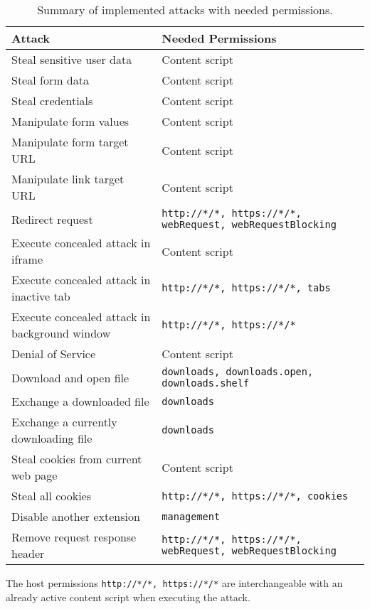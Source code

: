 	
	\begin{table}
		\begin{tabular}{|l|l|} \hline 
			\textbf{Attack} & \textbf{Needed Permissions} \\ \hline
			Steal sensitive user data & Content script \\
			Steal form data & Content script \\
			Steal credentials & Content script \\
			\hline
			Manipulate form values & Content script \\
			Manipulate form target URL & Content script \\
			Manipulate link target URL & Content script \\
			Redirect request & \texttt{http://*/*, https://*/*, webRequest, webRequestBlocking} \\
			\hline
			Execute concealed attack in iframe & Content script \\
			Execute concealed attack in inactive tab & \texttt{http://*/*, https://*/*, tabs} \\
			Execute concealed attack in background window & \texttt{http://*/*, https://*/*} \\
			\hline
			Denial of Service & Content script \\
			\hline
			Download and open file & \texttt{downloads, downloads.open, downloads.shelf} \\
			Exchange a downloaded file & \texttt{downloads} \\
			Exchange a currently downloading file & \texttt{downloads} \\
			\hline
			Steal cookies from current web page & Content script \\
			Steal all cookies & \texttt{http://*/*, https://*/*, cookies} \\
			\hline
			Disable another extension & \texttt{management} \\
			\hline
			Remove request response header & \texttt{http://*/*, https://*/*, webRequest, webRequestBlocking} \\
			\hline
		\end{tabular}
		\caption{Summary of implemented attacks with needed permissions.}
		The host permissions \texttt{http://*/*, https://*/*} are interchangeable with an already active content script when executing the attack.
		\label{tab:summaryAttacks}
	\end{table}